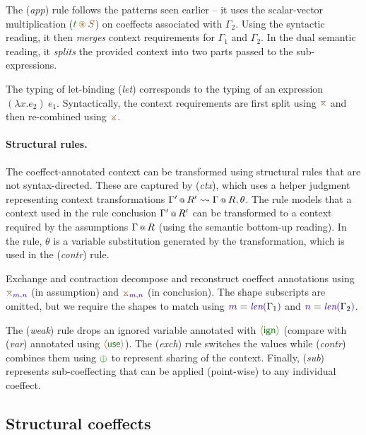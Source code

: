 The (\emph{app}) rule follows the patterns seen
earlier -- it uses the scalar-vector multiplication ($\cclrd{t}\,\aseq\,\aclrd{S}$) on 
coeffects associated with $\Gamma_2$.
Using the syntactic reading, it then \emph{merges} context requirements for $\Gamma_1$ and $\Gamma_2$.
In the dual semantic reading,
it \emph{splits} the provided context into two parts passed to the sub-expressions.

The typing of let-binding (\emph{let}) corresponds to the typing of an expression $(\lambda x.e_2)~e_1$.
Syntactically, the context requirements are first split using $\azip$ and then re-combined
using $\apar$. 

\paragraph{Structural rules.}
The coeffect-annotated context can be transformed using structural rules that are
not syntax-directed. These are captured by (\emph{ctx}), which uses a helper judgment representing
context transformations $\ctxtrans{ \coctx{\Gamma}{R} }{ \coctx{\Gamma'}{R'} }{\theta}$.
The rule models that a context used in the rule conclusion $\coctx{\Gamma'}{R'}$ can be transformed
to a context required by the assumptions $\coctx{\Gamma}{R}$ (using the semantic bottom-up reading).
In the rule, $\theta$ is a variable substitution generated by the transformation, which is 
used in the (\emph{contr}) rule.

Exchange and contraction decompose and reconstruct coeffect annotations 
using $\azip_{\sclrd{m},\sclrd{n}}$ (in assumption) and $\apar_{\sclrd{m},\sclrd{n}}$ (in conclusion). 
The shape subscripts are omitted, but we require the shapes to match using $\sclrd{m} = \slen{\Gamma_1}$
and $\sclrd{n} = \slen{\Gamma_2}$. 

The (\emph{weak}) rule drops an ignored variable annotated with $\aweak$ (compare with (\emph{var})
annotated using $\aunit$). The (\emph{exch}) rule switches the values 
while (\emph{contr}) combines them using $\cpar$ to represent sharing of the context.
Finally, (\emph{sub}) represents sub-coeffecting that can be applied (point-wise) to any
individual coeffect.


\subsection{Structural coeffects}
\label{sec:unified-structural}

